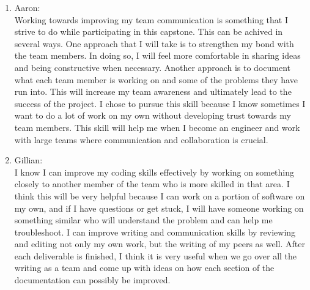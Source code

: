 \documentclass[12pt]{article}
\begin{document}
\begin{enumerate}
\begin{enumerate}
    \item{Aaron:}\\
    Working towards improving my team communication is something that I strive to do while participating
    in this capstone. This can be achived in several ways. One approach that I will take is 
    to strengthen my bond with the team members. In doing so, I will feel more comfortable in sharing ideas and 
    being constructive when necessary. Another approach is to document what each team member is working on and some of the problems they have run into.
    This will increase my team awareness and ultimately lead to the success of the project. I chose to pursue this skill
    because I know sometimes I want to do a lot of work on my own without developing trust towards my team members. This skill
    will help me when I become an engineer and work with large teams where communication and collaboration is crucial.
    \item {Gillian:}\\
    I know I can improve my coding skills effectively by working on something closely to another member of the team who is more skilled in that area. I think this will be very helpful because I can work on a portion of software on my own, and if I have questions or get stuck, I will have someone working on something similar who will understand the problem and can help me troubleshoot. 
    \noindent I can improve writing and communication skills by reviewing and editing not only my own work, but the writing of my peers as well. After each deliverable is finished, I think it is very useful when we go over all the writing as a team and come up with ideas on how each section of the documentation can possibly be improved. 
    
  \end{enumerate}
\end{enumerate}
\end{document}
